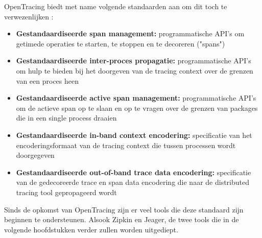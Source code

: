 OpenTracing biedt met name volgende standaarden aan om dit toch te verwezenlijken \autocite{Sigelman2016}:

\begin{itemize}
	\item \textbf{Gestandaardiseerde \gls{span} management:} programmatische \gls{API}'s om getimede operaties te starten, te stoppen en te decoreren ("\gls{span}s")
	\item \textbf{Gestandaardiseerde inter-proces propagatie:} programmatische \gls{API}'s om hulp te bieden bij het doorgeven van de tracing context over de grenzen van een proces heen
	\item \textbf{Gestandaardiseerde active \gls{span} management:} programmatische \gls{API}'s om de actieve \gls{span} op te slaan en op te vragen over de grenzen van packages die in een single process draaien
	\item \textbf{Gestandaardiseerde in-band context encodering:} specificatie van het encoderingsformaat van de tracing context die tussen processen wordt doorgegeven
	\item \textbf{Gestandaardiseerde out-of-band \gls{trace} data encodering:} specificatie van de gedecoreerde \gls{trace} en \gls{span} data encodering die naar de distributed tracing tool gepropageerd wordt
\end{itemize}

Sinds de opkomst van OpenTracing zijn er veel tools die deze standaard zijn beginnen te ondersteunen. Alsook Zipkin en Jeager, de twee tools die in de volgende hoofdstukken verder zullen worden uitgediept.